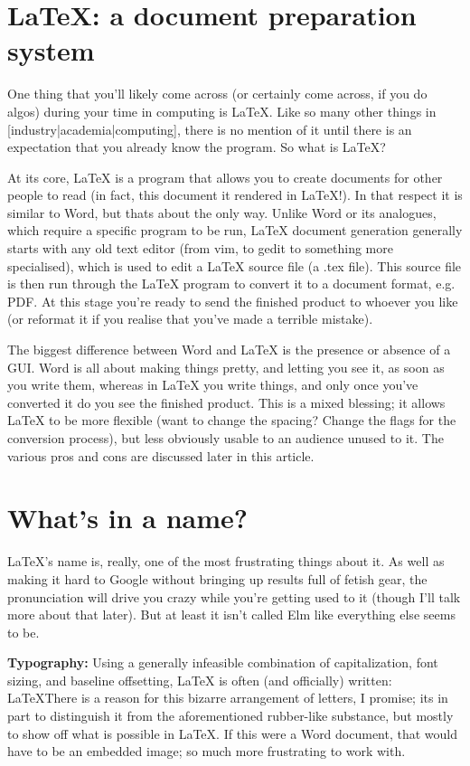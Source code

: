 \documentclass{article}
\begin{document}
\section*{LaTeX: a document preparation system}
One thing that you’ll likely come across (or certainly come across, if you do algos) during your time in computing is LaTeX. Like so many other things in [industry|academia|computing], there is no mention of it until there is an expectation that you already know the program. So what is LaTeX? 

At its core, LaTeX is a program that allows you to create documents for other people to read (in fact, this document it rendered in LaTeX!). In that respect it is similar to Word, but thats about the only way. Unlike Word or its analogues, which require a specific program to be run, LaTeX document generation generally starts with any old text editor (from vim, to gedit to something more specialised), which is used to edit a LaTeX source file (a .tex file). This source file is then run through the LaTeX program to convert it to a document format, e.g. PDF. At this stage you're ready to send the finished product to whoever you like (or reformat it if you realise that you’ve made a terrible mistake).

The biggest difference between Word and LaTeX is the presence or absence of a GUI. Word is all about making things pretty, and letting you see it, as soon as you write them, whereas in LaTeX you write things, and only once you’ve converted it do you see the finished product. This is a mixed blessing; it allows LaTeX to be more flexible (want to change the spacing? Change the flags for the conversion process), but less obviously usable to an audience unused to it. The various pros and cons are discussed later in this article.

\section*{What's in a name?}

LaTeX’s name is, really, one of the most frustrating things about it. As well as making it hard to Google without bringing up results full of fetish gear, the pronunciation will drive you crazy while you’re getting used to it (though I’ll talk more about that later). But at least it isn’t called Elm like everything else seems to be. 

\textbf{Typography:} Using a generally infeasible combination of capitalization, font sizing, and baseline offsetting, LaTeX is often (and officially) written: \LaTeX  There is a reason for this bizarre arrangement of letters, I promise; its in part to distinguish it from the aforementioned rubber-like substance, but mostly to show off what is possible in LaTeX. If this were a Word document, that would have to be an embedded image; so much more frustrating to work with. 
\end{document}
